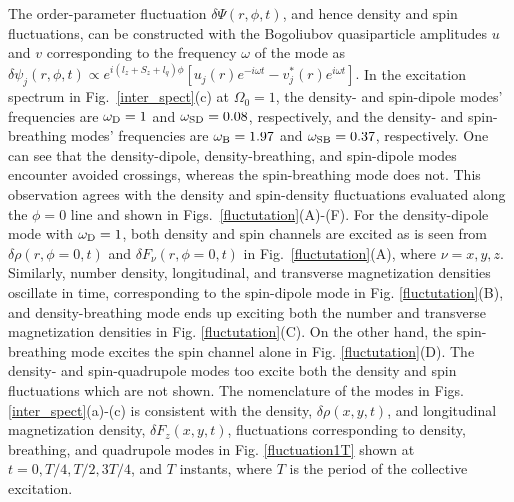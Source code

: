 \documentclass[pra,twocolumn,aps,superscriptaddress,showpacs,longbibliography]{revtex4-1}
\begin{document}
The order-parameter fluctuation $\delta \Psi(r,\phi,t)$, and hence density and spin fluctuations, can be constructed with the Bogoliubov quasiparticle amplitudes $u$ and $v$ corresponding to the frequency $\omega$ of the 
mode {\color{black} as  
$\delta \psi_j(r,\phi,t) \propto e^{i(l_z+S_z+l_q)\phi}\left[u_j(r) e^{-i\omega t}-v_j^*(r) e^{i\omega t}\right]$.}
In the excitation spectrum in Fig.~\ref{inter_spect}(c) at $\Omega_0=1$, the density- and spin-dipole modes'
frequencies are $\omega_{\rm D}=1$ and $\omega_{\rm SD}=0.08$, respectively, and  the density- and spin-breathing modes' frequencies 
are $\omega_{\rm B}=1.97$ and $\omega_{\rm SB}=0.37$, respectively. One can see that the density-dipole, density-breathing, 
and spin-dipole modes encounter
avoided crossings, whereas the spin-breathing mode does not. This observation agrees with the density and spin-density fluctuations evaluated
along the $\phi = 0$ line and shown in Figs.~\ref{fluctutation}(A)-(F). 
For the density-dipole mode with $\omega_{\rm D}=1$, both density and spin channels are excited as is seen
from  $\delta \rho(r,\phi =0,t)$ and $\delta F_\nu(r,\phi =0, t)$ in Fig.~\ref{fluctutation}(A), where $\nu = x,y,z$. Similarly, number density, longitudinal, 
and transverse magnetization densities oscillate in time, corresponding to the spin-dipole mode in Fig. \ref{fluctutation}(B), and density-breathing 
mode ends up exciting both the number and transverse magnetization densities in Fig. \ref{fluctutation}(C). On the other hand, the spin-breathing mode 
excites the spin channel alone in Fig. \ref{fluctutation}(D). The density- and spin-quadrupole modes 
too excite both the density and spin fluctuations which are not shown. The nomenclature of the modes
in Figs. \ref{inter_spect}(a)-(c) is consistent with the density, $\delta\rho(x,y,t)$, and longitudinal magnetization
density, $\delta F_z(x,y,t)$, fluctuations corresponding to density, breathing, and quadrupole modes in 
Fig. \ref{fluctuation1T} shown at $t=0, T/4, T/2, 3T/4$, and $T$ instants, where $T$ is the period of the collective 
excitation.
\end{document}
